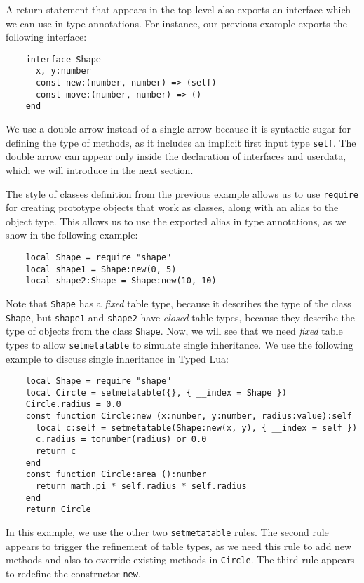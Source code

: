 A return statement that appears in the top-level also exports an
interface which we can use in type annotations.
For instance, our previous example exports the following interface:
\begin{verbatim}
    interface Shape
      x, y:number
      const new:(number, number) => (self)
      const move:(number, number) => ()
    end
\end{verbatim}

We use a double arrow instead of a single arrow because it is
syntactic sugar for defining the type of methods,
as it includes an implicit first input type \texttt{self}.
The double arrow can appear only inside the declaration of
interfaces and userdata, which we will introduce in the next section.

The style of classes definition from the previous example
allows us to use \texttt{require} for creating prototype objects that
work as classes, along with an alias to the object type.
This allows us to use the exported alias in type annotations,
as we show in the following example:
\begin{verbatim}
    local Shape = require "shape"
    local shape1 = Shape:new(0, 5)
    local shape2:Shape = Shape:new(10, 10)
\end{verbatim}

Note that \texttt{Shape} has a \emph{fixed} table type, because it
describes the type of the class \texttt{Shape}, but \texttt{shape1}
and \texttt{shape2} have \emph{closed} table types, because they
describe the type of objects from the class \texttt{Shape}.
Now, we will see that we need \emph{fixed} table types to allow
\texttt{setmetatable} to simulate single inheritance.
We use the following example to discuss single inheritance in Typed Lua:
\begin{verbatim}
    local Shape = require "shape"
    local Circle = setmetatable({}, { __index = Shape })
    Circle.radius = 0.0
    const function Circle:new (x:number, y:number, radius:value):self
      local c:self = setmetatable(Shape:new(x, y), { __index = self })
      c.radius = tonumber(radius) or 0.0
      return c
    end
    const function Circle:area ():number
      return math.pi * self.radius * self.radius
    end
    return Circle
\end{verbatim}

In this example, we use the other two \texttt{setmetatable} rules.
The second rule appears to trigger the refinement of table types,
as we need this rule to add new methods and also to override
existing methods in \texttt{Circle}.
The third rule appears to redefine the constructor \texttt{new}.

